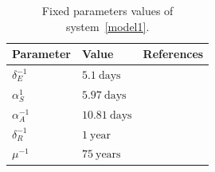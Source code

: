 \begin{table}[h!]
\begin{center}
	\begin{tabular}{>{\centering}p{}p{}p{}}
		\toprule
		Parameter & Value & References
		\\
		\midrule
		$\delta_{E}^{-1}$ & $5.1\ \text{days}$   &  \cite{Tian2020}
		\\
		$\alpha_{S}^{1}$  & $5.97\ \text{days}$  &  \cite{Acuna2020}
		\\
		$\alpha_{A}^{-1}$ & $10.81\ \text{days}$ & \cite{Acuna2020}
		\\
		$\delta_{R}^{-1}$ & $1\ \text{year}$     &
		\\
		$\mu^{-1}$        & $75\ \text{years}$   &
		\\
		\bottomrule
		\end{tabular}
		\caption{Fixed parameters values of system~\ref{model1}.}\label{table_fixparam}
	\end{center}
\end{table}

